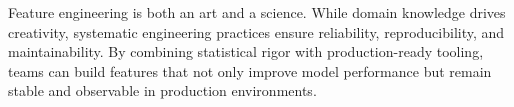 Feature engineering is both an art and a science. While domain knowledge drives creativity, systematic engineering practices ensure reliability, reproducibility, and maintainability. By combining statistical rigor with production-ready tooling, teams can build features that not only improve model performance but remain stable and observable in production environments.
